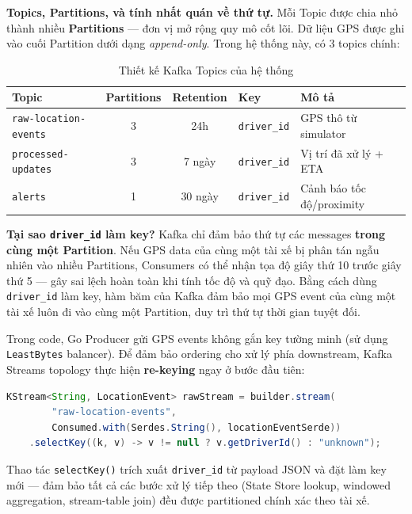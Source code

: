 \bigskip
\noindent
\textbf{Topics, Partitions, và tính nhất quán về thứ tự.} Mỗi Topic được chia nhỏ thành nhiều \textbf{Partitions} — đơn vị mở rộng quy mô cốt lõi. Dữ liệu GPS được ghi vào cuối Partition dưới dạng \textit{append-only}. Trong hệ thống này, có 3 topics chính:

\begin{table}[H]
\centering
\caption{Thiết kế Kafka Topics của hệ thống}
\label{tab:kafka-topics}
\begin{tabular}{|l|c|c|l|l|}
\hline
\textbf{Topic} & \textbf{Partitions} & \textbf{Retention} & \textbf{Key} & \textbf{Mô tả} \\
\hline
\texttt{raw-location-events} & 3 & 24h & \texttt{driver\_id} & GPS thô từ simulator \\
\hline
\texttt{processed-updates} & 3 & 7 ngày & \texttt{driver\_id} & Vị trí đã xử lý + ETA \\
\hline
\texttt{alerts} & 1 & 30 ngày & \texttt{driver\_id} & Cảnh báo tốc độ/proximity \\
\hline
\end{tabular}
\end{table}

\noindent
\textbf{Tại sao \texttt{driver\_id} làm key?} Kafka chỉ đảm bảo thứ tự các messages \textbf{trong cùng một Partition}. Nếu GPS data của cùng một tài xế bị phân tán ngẫu nhiên vào nhiều Partitions, Consumers có thể nhận tọa độ giây thứ 10 trước giây thứ 5 — gây sai lệch hoàn toàn khi tính tốc độ và quỹ đạo. Bằng cách dùng \texttt{driver\_id} làm key, hàm băm của Kafka đảm bảo mọi GPS event của cùng một tài xế luôn đi vào cùng một Partition, duy trì thứ tự thời gian tuyệt đối.

Trong code, Go Producer gửi GPS events không gắn key tường minh (sử dụng \texttt{LeastBytes} balancer). Để đảm bảo ordering cho xử lý phía downstream, Kafka Streams topology thực hiện \textbf{re-keying} ngay ở bước đầu tiên:

\begin{lstlisting}[language=Java, caption={Re-keying GPS events theo \texttt{driver\_id} trong Kafka Streams}, label={lst:rekey}]
KStream<String, LocationEvent> rawStream = builder.stream(
        "raw-location-events",
        Consumed.with(Serdes.String(), locationEventSerde))
    .selectKey((k, v) -> v != null ? v.getDriverId() : "unknown");
\end{lstlisting}

Thao tác \texttt{selectKey()} trích xuất \texttt{driver\_id} từ payload JSON và đặt làm key mới — đảm bảo tất cả các bước xử lý tiếp theo (State Store lookup, windowed aggregation, stream-table join) đều được partitioned chính xác theo tài xế.

